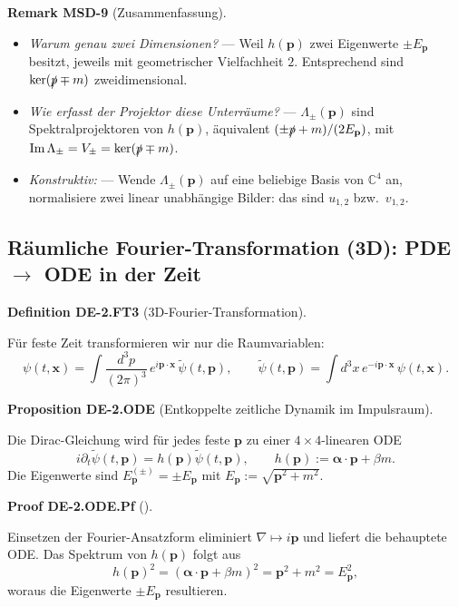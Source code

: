 \documentclass[10pt, letterpaper]{article}
\newcommand{\C}{\mathbb{C}}
\newcommand{\CustomHeading}[3]{%
  \par\medskip\noindent%
  \textbf{#1 #2} \textnormal{(#3)}.\enskip%
}
\newenvironment{DEF}[2]{\begin{unitbox}\CustomHeading{Definition}{#1}{#2}}{\end{unitbox}}
\newenvironment{PROP}[2]{\begin{unitbox}\CustomHeading{Proposition}{#1}{#2}}{\end{unitbox}}
\newenvironment{REM}[2]{\begin{unitbox}\CustomHeading{Remark}{#1}{#2}}{\end{unitbox}}
\newenvironment{PROOF}[2]{\begin{unitbox}\CustomHeading{Proof}{#1}{#2}}{\end{unitbox}}
\begin{document}
\begin{REM}{MSD-9}{Zusammenfassung}
\begin{itemize}
\item \emph{Warum genau zwei Dimensionen?} — Weil $h(\mathbf p)$ zwei Eigenwerte $\pm E_{\mathbf p}$ besitzt, jeweils mit geometrischer Vielfachheit $2$. Entsprechend sind $\ker(\slashed p\mp m)$ zweidimensional.
\item \emph{Wie erfasst der Projektor diese Unterräume?} — $\Lambda_\pm(\mathbf p)$ sind Spektralprojektoren von $h(\mathbf p)$, äquivalent $(\pm\slashed p+m)/(2E_{\mathbf p})$, mit $\mathrm{Im}\,\Lambda_\pm=V_\pm=\ker(\slashed p\mp m)$.
\item \emph{Konstruktiv:} — Wende $\Lambda_\pm(\mathbf p)$ auf eine beliebige Basis von $\C^4$ an, normalisiere zwei linear unabhängige Bilder: das sind $u_{1,2}$ bzw.\ $v_{1,2}$.
\end{itemize}
\end{REM}

\subsection{Räumliche Fourier-Transformation (3D): PDE $\to$ ODE in der Zeit}

\begin{DEF}{DE-2.FT3}{3D-Fourier-Transformation}
Für feste Zeit transformieren wir nur die Raumvariablen:
\[
\psi(t,\mathbf x)=\int\!\frac{d^3p}{(2\pi)^3}\,e^{i\mathbf p\cdot\mathbf x}\,\tilde\psi(t,\mathbf p),\qquad
\tilde\psi(t,\mathbf p)=\int d^3x\,e^{-i\mathbf p\cdot\mathbf x}\,\psi(t,\mathbf x).
\]
\end{DEF}

\begin{PROP}{DE-2.ODE}{Entkoppelte zeitliche Dynamik im Impulsraum}
Die Dirac-Gleichung wird für jedes feste $\mathbf p$ zu einer $4\times4$-linearen ODE
\[
 i\partial_t \tilde\psi(t,\mathbf p)=h(\mathbf p)\tilde\psi(t,\mathbf p),\qquad
 h(\mathbf p):=\boldsymbol{\alpha}\cdot\mathbf p+\beta m.
\]
Die Eigenwerte sind $E_{\mathbf p}^{(\pm)}=\pm E_{\mathbf p}$ mit $E_{\mathbf p}:=\sqrt{\mathbf p^2+m^2}$.
\end{PROP}

\begin{PROOF}{DE-2.ODE.Pf}{}
Einsetzen der Fourier-Ansatzform eliminiert $\nabla\mapsto i\mathbf p$ und liefert die behauptete ODE. Das Spektrum von $h(\mathbf p)$ folgt aus
\[
h(\mathbf p)^2 = (\boldsymbol{\alpha}\cdot\mathbf p+\beta m)^2
= \mathbf p^2 + m^2 = E_{\mathbf p}^2,
\]
woraus die Eigenwerte $\pm E_{\mathbf p}$ resultieren.
\end{PROOF}
\end{document}
